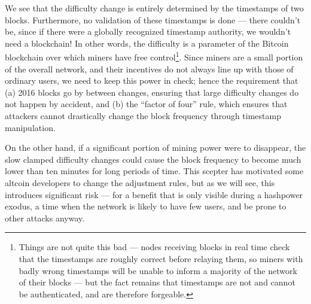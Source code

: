 \documentclass[letterpaper]{article}
\begin{document}
We see that the difficulty change is entirely determined by the timestamps of two
blocks. Furthermore, no validation of these timestamps is done --- there couldn't
be, since if there were a globally recognized timestamp authority, we wouldn't
need a blockchain! In other words, the difficulty is a parameter of the Bitcoin
blockchain over which miners have free control\footnote{Things are not quite this
bad --- nodes receiving blocks in real time check that the timestamps are roughly
correct before relaying them, so miners with badly wrong timestamps will be unable
to inform a majority of the network of their blocks --- but the fact remains that
timestamps are not and cannot be authenticated, and are therefore forgeable.}.
Since miners are a small portion of the overall network, and their incentives do
not always line up with those of ordinary users, we need to keep this power in check;
hence the requirement that (a) 2016 blocks go by between changes, ensuring that large
difficulty changes do not happen by accident, and (b) the ``factor of four'' rule,
which ensures that attackers cannot drastically change the block frequency through
timestamp manipulation.

On the other hand, if a significant portion of mining power were to disappear, the
slow clamped difficulty changes could cause the block frequency to become much lower
than ten minutes for long periods of time. This scepter has motivated some altcoin
developers to change the adjustment rules, but as we will see, this introduces
significant risk --- for a benefit that is only visible during a hashpower exodus,
a time when the network is likely to have few users, and be prone to other attacks
anyway.
\end{document}
